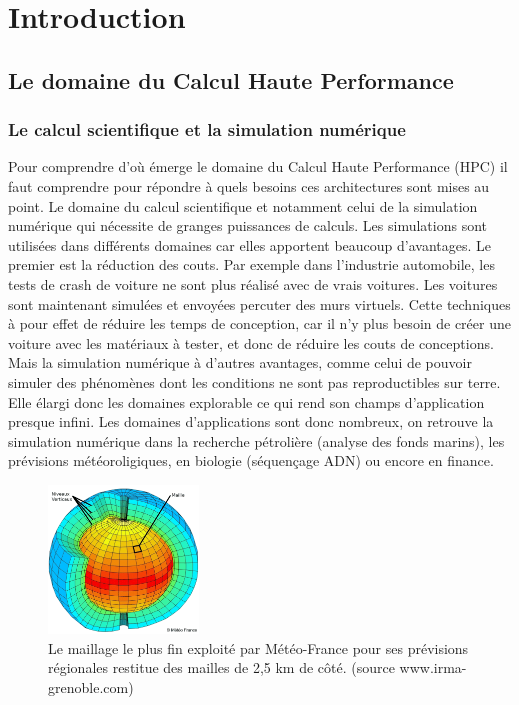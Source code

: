 \chapter{Introduction}
\label{chap:intro}
\minitoc


 
 
 \section{Le domaine du Calcul Haute Performance} 
 


 \subsection{Le calcul scientifique et la simulation numérique}

Pour comprendre d'où émerge le domaine du Calcul Haute Performance (HPC) il faut comprendre pour répondre à quels besoins ces architectures sont mises au point. 
Le domaine du calcul scientifique et notamment celui de la simulation numérique qui nécessite de granges puissances de calculs. Les simulations sont utilisées dans différents domaines car elles apportent beaucoup d'avantages. Le premier est la réduction des couts. Par exemple dans l'industrie automobile, les tests de crash de voiture ne sont plus réalisé avec de vrais voitures. Les voitures sont maintenant simulées et envoyées percuter des murs virtuels. Cette techniques à pour effet de réduire les temps de conception, car il n'y plus besoin de créer une voiture avec les matériaux à tester, et donc de réduire les couts de conceptions. Mais la simulation numérique à d'autres avantages, comme celui de pouvoir simuler des phénomènes dont les conditions ne sont pas reproductibles sur terre. Elle élargi donc les domaines explorable ce qui rend son champs d'application presque infini. Les domaines d'applications sont donc nombreux, on retrouve la simulation numérique dans la recherche pétrolière (analyse des fonds marins), les prévisions météoroligiques, en biologie (séquençage ADN) ou encore en finance.

\begin{figure}[H]
    \center
    \includegraphics[width=4cm]{images/Chapitre1/maillage.png}
    \caption{\label{maillage} Le maillage le plus fin exploité par Météo-France pour ses prévisions régionales restitue des mailles de 2,5 km de côté. (source www.irma-grenoble.com)}
\end{figure}


